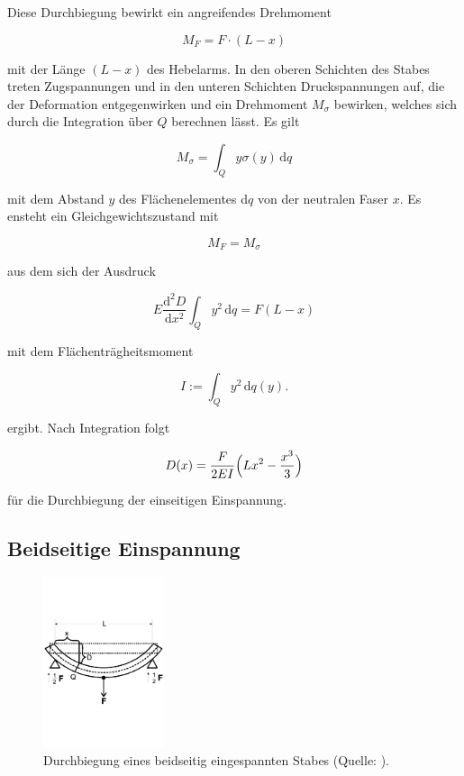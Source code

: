     \noindent
    Diese Durchbiegung bewirkt  ein angreifendes Drehmoment

    \begin{equation}
M_F=F \cdot (L-x)
    \end{equation}

    \noindent
    mit der Länge $(L-x)$ des Hebelarms.
    In den oberen Schichten des Stabes treten Zugspannungen und in den unteren Schichten Druckspannungen auf,
    die der Deformation entgegenwirken und ein Drehmoment $M_\sigma$ bewirken,
    welches sich durch die Integration über $Q$ berechnen lässt.
    Es gilt

    \begin{equation*}
M_\sigma = \int_Q y\sigma (y) \, \text{d}q
    \end{equation*}

    \noindent
    mit dem Abstand $y$ des Flächenelementes d$q$ von der neutralen Faser $x$.
    Es ensteht ein Gleichgewichtszustand mit
    
    \begin{equation*}
M_F = M_\sigma
    \end{equation*}

    \noindent
    aus dem sich der Ausdruck 

    \begin{equation}
E\frac{\text{d}^2D}{\text{d}x^2}\int_Q y^2 \, \text{d}q = F(L-x)
    \end{equation}

    \noindent
    mit dem Flächenträgheitsmoment

    \begin{equation}
I := \int_Q y^2 \, \text{d}q(y).
    \end{equation}

    \noindent
    ergibt.
    Nach Integration folgt

    \begin{equation}
D(x) = \frac{F}{2EI} \Bigl(Lx^2-\frac{x^3}{3}\Bigr)
        \label{eqn:deins}
    \end{equation}

    \noindent
    für die Durchbiegung der einseitigen Einspannung.

\subsection{Beidseitige Einspannung}

\begin{figure}
    \centering
       \includegraphics[height=5cm]{beids.pdf}
       \caption{Durchbiegung eines beidseitig eingespannten Stabes (Quelle: \cite{V103}).}
       \label{fig:beids}
\end{figure}

